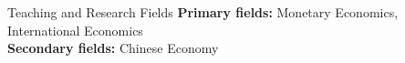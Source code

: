 \documentclass{resume} %
\begin{document}

\begin{rSection}{Teaching and Research Fields}
{\bf Primary fields:} Monetary Economics, International Economics \\ 
{\bf Secondary fields:} Chinese Economy  \\
\end{rSection}
\bigskip \bigskip






\end{document}
